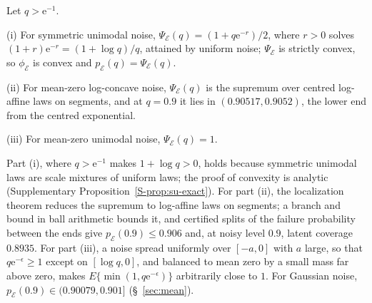\documentclass[lineno]{biometrika}
\begin{document}
\begin{theorem}\label{thm:classes}
Let $q > \mathrm{e}^{-1}$.
\par\noindent (i) For symmetric unimodal noise, $\Psi_{\mathcal E}(q) = (1 + q \mathrm{e}^{-r})/2$, where $r > 0$ solves $(1 + r)\mathrm{e}^{-r} = (1 + \log q)/q$, attained by uniform noise; $\Psi_{\mathcal E}$ is strictly convex, so $\phi_{\mathcal E}$ is convex and $p_{\mathcal E}(q) = \Psi_{\mathcal E}(q)$.
\par\noindent (ii) For mean-zero log-concave noise, $\Psi_{\mathcal E}(q)$ is the supremum over centred log-affine laws on segments, and at $q = 0.9$ it lies in $(0.90517, 0.9052)$, the lower end from the centred exponential.
\par\noindent (iii) For mean-zero unimodal noise, $\Psi_{\mathcal E}(q) = 1$.
\end{theorem}

Part (i), where $q > \mathrm{e}^{-1}$ makes $1 + \log q > 0$, holds because symmetric unimodal laws are scale mixtures of uniform laws; the proof of convexity is analytic (Supplementary Proposition~\ref{S-prop:su-exact}). For part (ii), the localization theorem \citep{fradelizi2004} reduces the supremum to log-affine laws on segments; a branch and bound in ball arithmetic bounds it, and certified splits of the failure probability between the ends give $p_{\mathcal E}(0.9) \le 0.906$ and, at noisy level $0.9$, latent coverage $0.8935$. For part (iii), a noise spread uniformly over $[-a, 0]$ with $a$ large, so that $q\mathrm{e}^{-\epsilon} \ge 1$ except on $[\log q, 0]$, and balanced to mean zero by a small mass far above zero, makes $E\{\min(1, q\mathrm{e}^{-\epsilon})\}$ arbitrarily close to $1$. For Gaussian noise, $p_{\mathcal E}(0.9) \in (0.90079, 0.901]$ (\S~\ref{sec:mean}).
\end{document}
